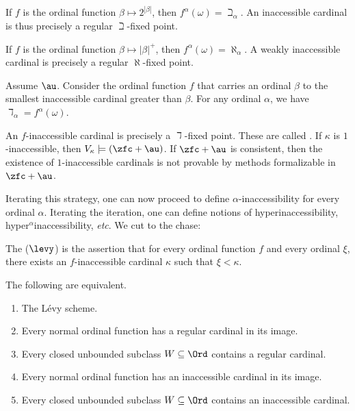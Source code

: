 \begin{eg}
	If $ f $ is the ordinal function $ \beta \mapsto 2^{|\beta|} $,
	then $ f^{\alpha}(\omega) = \beth_{\alpha} $.
	An inaccessible cardinal is thus precisely a regular $ \beth $-fixed point.
	
	If $ f $ is the ordinal function $ \beta \mapsto |\beta|^+ $,
	then $ f^{\alpha}(\omega) = \aleph_{\alpha} $. 
	A weakly inaccessible cardinal is precisely a regular $ \aleph $-fixed  point.
\end{eg}

\begin{eg}
	Assume $ \au $.
	Consider the ordinal function $ f $ that carries
	an ordinal $ \beta $ to the smallest inaccessible cardinal greater than $ \beta $.
	For any ordinal $ \alpha $,
	we have $ \daleth_{\alpha} = f^{\alpha}(\omega) $.

	An $ f $-inaccessible cardinal is precisely a $ \daleth $-fixed point.
	These are called .
	If $ \kappa $ is $ 1 $-inaccessible, then
	$ V_{\kappa} \models (\zfc + \au) $.
	If $ \zfc + \au $ is consistent, then
	the existence of $ 1 $-inaccessible cardinals is not provable
	by methods formalizable in $ \zfc + \au $.
\end{eg}

Iterating this strategy,
one can now proceed to define $ \alpha $-inaccessibility
for every ordinal $ \alpha $.
Iterating the iteration,
one can define notions of
hyperinaccessibility, hyper${}^{\alpha}$inaccessibility, \emph{etc}.
We cut to the chase:

\begin{axiom}
	The  ($ \levy $) is the assertion that
	for every ordinal function $ f $ and every ordinal $ \xi $,
	there exists an $ f $-inaccessible cardinal $ \kappa $ such that $ \xi < \kappa $.
\end{axiom}

\begin{theorem}
	The following are equivalent.
	\begin{enumerate}
		\item The Lévy scheme.
		\item Every normal ordinal function
			has a regular cardinal in its image.
		\item Every closed unbounded subclass $ W \subseteq \Ord $
			contains a regular cardinal.
		\item Every normal ordinal function
			has an inaccessible cardinal in its image.
		\item Every closed unbounded subclass $ W \subseteq \Ord $
			contains an inaccessible cardinal.
	\end{enumerate}
\end{theorem}

